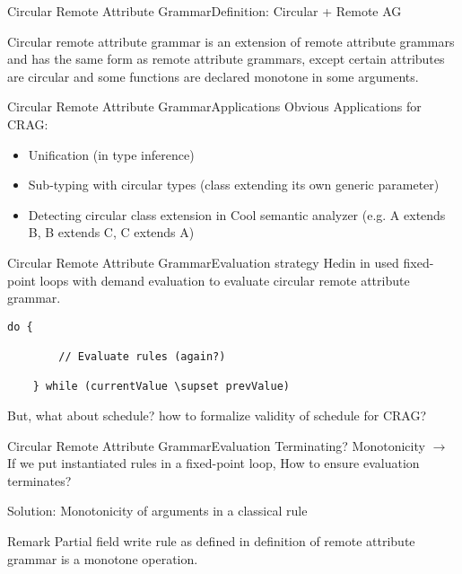 \begin{frame}{Circular Remote Attribute Grammar}{Definition: Circular + Remote AG}

\begin{definition}
Circular remote attribute grammar is an \alert{extension of remote attribute grammars} and has the same form as remote attribute grammars, except \alert{certain attributes are circular} and \alert{some functions are declared monotone in some arguments}.
\end{definition}
\end{frame}


\begin{frame}{Circular Remote Attribute Grammar}{Applications}
Obvious Applications for CRAG:

\begin{itemize}
    \item Unification (in type inference)
	\item Sub-typing with circular types (class extending its own generic parameter)
	\item Detecting circular class extension in Cool semantic analyzer (e.g. A extends B, B extends C, C extends A)
\end{itemize}
\end{frame}


\begin{frame}[fragile=singleslide]{Circular Remote Attribute Grammar}{Evaluation strategy}
Hedin in \cite{10.1016/j.scico.2005.06.005} used fixed-point loops with \alert{demand evaluation} to evaluate circular remote attribute grammar.

\begin{Verbatim}[fontsize=\small]
    do {
    
        // Evaluate rules (again?)
        
    } while (currentValue \supset prevValue)
\end{Verbatim}

\newlinevspace

But, what about \alert{schedule}? how to formalize validity of schedule for CRAG?
\end{frame}



\begin{frame}{Circular Remote Attribute Grammar}{Evaluation Terminating? Monotonicity}
$\to$ If we put instantiated rules in a fixed-point loop, How to \alert{ensure evaluation terminates}?

\newlinevspace

Solution: \alert{Monotonicity} of arguments in a classical rule

\newlinevspace

\begin{block}{Remark}
Partial field write rule as defined in definition of remote attribute grammar \alert{is a monotone operation}.
\end{block}
\end{frame}




